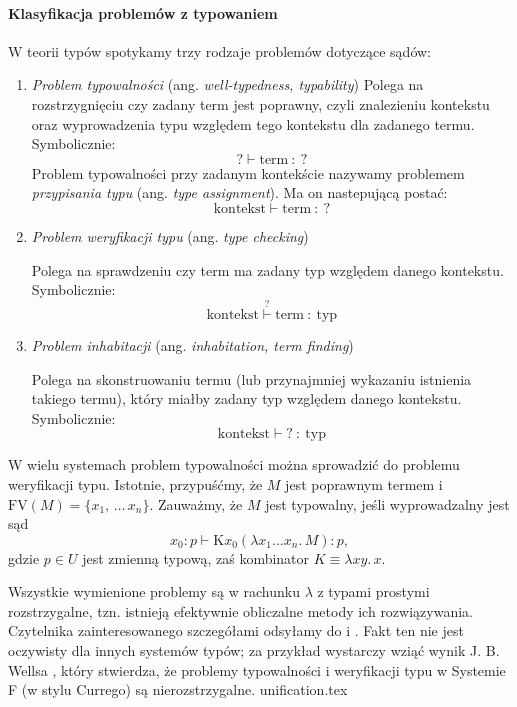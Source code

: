 \paragraph{Klasyfikacja problemów z typowaniem}
W teorii typów spotykamy trzy rodzaje problemów dotyczące sądów:
\begin{enumerate}
  \setlength\itemsep{0em}
  \item \emph{Problem typowalności} (ang. \emph{well-typedness, typability})
    Polega na rozstrzygnięciu czy zadany term jest poprawny, czyli znalezieniu kontekstu oraz wyprowadzenia typu względem tego kontekstu dla zadanego termu. Symbolicznie:
    \[ \mathbf{?} \vdash \text{term}\ :\ \mathbf{?} \]
    Problem typowalności przy zadanym kontekście nazywamy problemem \emph{przypisania typu} (ang. \emph{type assignment}). Ma on nastepującą postać: 
    \[ \text{kontekst} \vdash \text{term}\ :\ \mathbf{?} \]
  \item \emph{Problem weryfikacji typu} (ang. \emph{type checking}) 
    
    Polega na sprawdzeniu czy term ma zadany typ względem danego kontekstu. Symbolicznie:
    \[ \text{kontekst} \stackrel{\mathbf{?}}{\vdash} \text{term}\ :\ \text{typ} \]
  \item \emph{Problem inhabitacji} (ang. \emph{inhabitation, term finding})

    Polega na skonstruowaniu termu (lub przynajmniej wykazaniu istnienia takiego termu), który    miałby zadany typ względem danego kontekstu. Symbolicznie: 
    \[
      \text{kontekst} \vdash \mathbf{?}\ :\ \text{typ}
    \]
\end{enumerate}

W wielu systemach problem typowalności można sprowadzić do problemu weryfikacji typu. Istotnie, przypuśćmy, że \(M\) jest poprawnym termem i \(\mathrm{FV}(M)=\{x_1,\,\dots\,x_n\}\). Zauważmy, że \(M\) jest typowalny, jeśli wyprowadzalny jest sąd
\[
  x_0:p\vdash \mathrm{K} x_0 (\lambda x_1 \dots x_n.\,M):p,
\]
gdzie \(p\in U\) jest zmienną typową, zaś kombinator \(K\equiv \lambda xy.\,x\).

Wszystkie wymienione problemy są w rachunku \(\lambda\) z typami prostymi rozstrzygalne, tzn. istnieją efektywnie obliczalne metody ich rozwiązywania. Czytelnika zainteresowanego szczegółami odsyłamy do \cite[Twierdzenie 3.2.7]{Urzyczyn2006} i \cite[Rozdział 4.4]{Barendregt_1992}.
Fakt ten nie jest oczywisty dla innych systemów typów; za przykład wystarczy wziąć wynik J. B. Wellsa \cite{Wells_98}, który stwierdza, że problemy typowalności i weryfikacji typu w Systemie F (w stylu Currego) są nierozstrzygalne.
{unification.tex}


